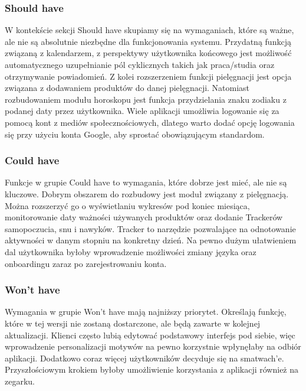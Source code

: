 \subsubsection*{\textbf{Should have}}
\phantom{Th}
W kontekście sekcji Should have skupiamy się na wymaganiach, które są ważne, ale nie są absolutnie niezbędne dla funkcjonowania systemu. 
Przydatną funkcją związaną z kalendarzem, z perspektywy użytkownika końcowego jest możliwość automatycznego uzupełnianie pól cyklicznych 
takich jak praca/studia oraz otrzymywanie powiadomień. Z kolei rozszerzeniem funkcji pielęgnacji jest opcja związana z dodawaniem 
produktów do danej pielęgnacji. Natomiast rozbudowaniem modułu horoskopu jest funkcja przydzielania znaku zodiaku 
z podanej daty przez użytkownika. Wiele aplikacji umożliwia logowanie się za pomocą kont z mediów społecznościowych, 
dlatego warto dodać opcję logowania się przy użyciu konta Google, aby sprostać obowiązującym standardom. 

\subsubsection*{\textbf{Could have}}
\phantom{Th}
Funkcje w grupie Could have to wymagania, które dobrze jest mieć, ale nie są kluczowe. 
Dobrym obszarem do rozbudowy jest moduł związany z pielęgnacją. 
Można rozszerzyć go o wyświetlaniu wykresów pod koniec miesiąca, 
monitorowanie daty ważności używanych produktów oraz dodanie Trackerów samopoczucia, snu i nawyków. 
Tracker to narzędzie pozwalające na odnotowanie aktywności w danym stopniu na konkretny dzień. 
Na pewno dużym ułatwieniem dal użytkownika byłoby wprowadzenie możliwości zmiany języka oraz onboardingu zaraz po zarejestrowaniu konta.


\subsubsection*{\textbf{Won't have}}
\phantom{Th}
Wymagania w grupie Won't have mają najniższy priorytet. Określają funkcję, które w tej wersji nie zostaną dostarczone, 
ale będą zawarte w kolejnej aktualizacji. Klienci często lubią edytować podstawowy interfejs pod siebie, 
więc wprowadzenie personalizacji motywów na pewno korzystnie wpłynęłaby na odbiór aplikacji. 
Dodatkowo coraz więcej użytkowników decyduje się na smatwach'e. 
Przyszłościowym krokiem byłoby umożliwienie korzystania z aplikacji również na zegarku.
